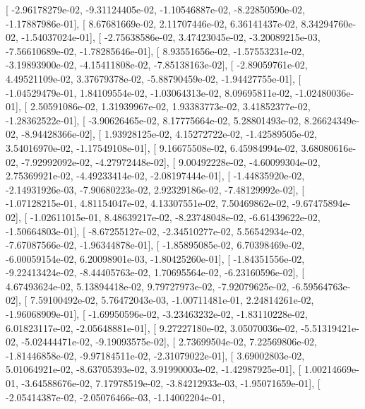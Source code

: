 \documentclass{article}
\begin{document}
       [ -2.96178279e-02,  -9.31124405e-02,  -1.10546887e-02,
         -8.22850590e-02,  -1.17887986e-01],
       [  8.67681669e-02,   2.11707446e-02,   6.36141437e-02,
          8.34294760e-02,  -1.54037024e-01],
       [ -2.75638586e-02,   3.47423045e-02,  -3.20089215e-03,
         -7.56610689e-02,  -1.78285646e-01],
       [  8.93551656e-02,  -1.57553231e-02,  -3.19893900e-02,
         -4.15411808e-02,  -7.85138163e-02],
       [ -2.89059761e-02,   4.49521109e-02,   3.37679378e-02,
         -5.88790459e-02,  -1.94427755e-01],
       [ -1.04529479e-01,   1.84109554e-02,  -1.03064313e-02,
          8.09695811e-02,  -1.02480036e-01],
       [  2.50591086e-02,   1.31939967e-02,   1.93383773e-02,
          3.41852377e-02,  -1.28362522e-01],
       [ -3.90626465e-02,   8.17775664e-02,   5.28801493e-02,
          8.26624349e-02,  -8.94428366e-02],
       [  1.93928125e-02,   4.15272722e-02,  -1.42589505e-02,
          3.54016970e-02,  -1.17549108e-01],
       [  9.16675508e-02,   6.45984994e-02,   3.68080616e-02,
         -7.92992092e-02,  -4.27972448e-02],
       [  9.00492228e-02,  -4.60099304e-02,   2.75369921e-02,
         -4.49233414e-02,  -2.08197444e-01],
       [ -1.44835920e-02,  -2.14931926e-03,  -7.90680223e-02,
          2.92329186e-02,  -7.48129992e-02],
       [ -1.07128215e-01,   4.81154047e-02,   4.13307551e-02,
          7.50469862e-02,  -9.67475894e-02],
       [ -1.02611015e-01,   8.48639217e-02,  -8.23748048e-02,
         -6.61439622e-02,  -1.50664803e-01],
       [ -8.67255127e-02,  -2.34510277e-02,   5.56542934e-02,
         -7.67087566e-02,  -1.96344878e-01],
       [ -1.85895085e-02,   6.70398469e-02,  -6.00059154e-02,
          6.20098901e-03,  -1.80425260e-01],
       [ -1.84351556e-02,  -9.22413424e-02,  -8.44405763e-02,
          1.70695564e-02,  -6.23160596e-02],
       [  4.67493624e-02,   5.13894418e-02,   9.79727973e-02,
         -7.92079625e-02,  -6.59564763e-02],
       [  7.59100492e-02,   5.76472043e-03,  -1.00711481e-01,
          2.24814261e-02,  -1.96068909e-01],
       [ -1.69950596e-02,  -3.23463232e-02,  -1.83110228e-02,
          6.01823117e-02,  -2.05648881e-01],
       [  9.27227180e-02,   3.05070036e-02,  -5.51319421e-02,
         -5.02444471e-02,  -9.19093575e-02],
       [  2.73699504e-02,   7.22569806e-02,  -1.81446858e-02,
         -9.97184511e-02,  -2.31079022e-01],
       [  3.69002803e-02,   5.01064921e-02,  -8.63705393e-02,
          3.91990003e-02,  -1.42987925e-01],
       [  1.00214669e-01,  -3.64588676e-02,   7.17978519e-02,
         -3.84212933e-03,  -1.95071659e-01],
       [ -2.05414387e-02,  -2.05076466e-03,  -1.14002204e-01,
\end{document}
